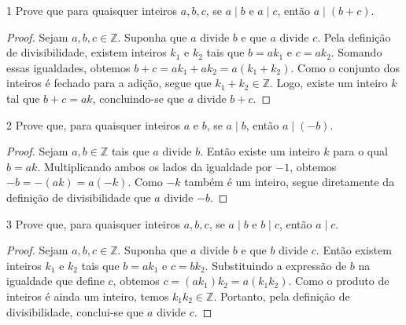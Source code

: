 \documentclass[12pt]{article}
\begin{document}
\begin{exercisebox}{1}
Prove que para quaisquer inteiros \(a,b,c\), se 
\(a \mid b\) e \(a \mid c\), então \(a \mid (b+c)\).
\end{exercisebox}

\begin{proof}
Sejam \(a,b,c \in \mathbb{Z}\). Suponha que \(a\) divide
\(b\) e que \(a\) divide \(c\). Pela definição de
divisibilidade, existem inteiros \(k_1\) e \(k_2\) tais que
\(b = ak_1\) e \(c = ak_2\).
Somando essas igualdades, obtemos
\(b+c = ak_1 + ak_2 = a(k_1+k_2)\).
Como o conjunto dos inteiros é fechado para a adição,
segue que \(k_1+k_2 \in \mathbb{Z}\).
Logo, existe um inteiro \(k\) tal que
\(b+c = ak\), concluindo-se que \(a\) divide \(b+c\).
\end{proof}

\begin{exercisebox}{2}
Prove que, para quaisquer inteiros \(a\) e \(b\),
se \(a \mid b\), então \(a \mid (-b)\).
\end{exercisebox}

\begin{proof}
Sejam \(a,b \in \mathbb{Z}\) tais que \(a\) divide \(b\).
Então existe um inteiro \(k\) para o qual
\(b = ak\).
Multiplicando ambos os lados da igualdade por \(-1\),
obtemos \(-b = -(ak) = a(-k)\).
Como \(-k\) também é um inteiro,
segue diretamente da definição de divisibilidade que
\(a\) divide \(-b\).
\end{proof}

\begin{exercisebox}{3}
Prove que, para quaisquer inteiros \(a,b,c\),
se \(a \mid b\) e \(b \mid c\),
então \(a \mid c\).
\end{exercisebox}

\begin{proof}
Sejam \(a,b,c \in \mathbb{Z}\).
Suponha que \(a\) divide \(b\) e que \(b\) divide \(c\).
Então existem inteiros \(k_1\) e \(k_2\) tais que
\(b = ak_1\) e \(c = bk_2\).
Substituindo a expressão de \(b\) na igualdade que define
\(c\), obtemos
\(c = (ak_1)k_2 = a(k_1k_2)\).
Como o produto de inteiros é ainda um inteiro,
temos \(k_1k_2 \in \mathbb{Z}\).
Portanto, pela definição de divisibilidade,
conclui-se que \(a\) divide \(c\).
\end{proof}
\end{document}
